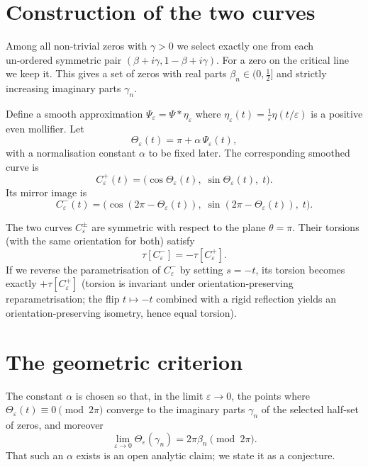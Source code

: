 \documentclass[12pt,a4paper]{article}
\begin{document}
\section{Construction of the two curves}

Among all non‑trivial zeros with \(\gamma>0\) we select exactly one from each
un‑ordered symmetric pair \((\beta+i\gamma, 1-\beta+i\gamma)\).  For a zero on the
critical line we keep it.  This gives a set of zeros with real parts
\(\beta_n\in(0,\frac12]\) and strictly increasing imaginary parts \(\gamma_n\).

Define a smooth approximation \(\Psi_\varepsilon = \Psi * \eta_\varepsilon\) where
\(\eta_\varepsilon(t)=\frac1\varepsilon\eta(t/\varepsilon)\) is a positive even
mollifier.  Let
\[
\Theta_\varepsilon(t) = \pi + \alpha\,\Psi_\varepsilon(t),
\]
with a normalisation constant \(\alpha\) to be fixed later.  The corresponding
smoothed curve is
\[
C_\varepsilon^+(t) = \bigl( \cos\Theta_\varepsilon(t),\; \sin\Theta_\varepsilon(t),\; t \bigr).
\]
Its mirror image is
\[
C_\varepsilon^-(t) = \bigl( \cos(2\pi-\Theta_\varepsilon(t)),\;
                         \sin(2\pi-\Theta_\varepsilon(t)),\; t \bigr).
\]

The two curves \(C_\varepsilon^\pm\) are symmetric with respect to the plane
\(\theta=\pi\).  Their torsions (with the same orientation for both) satisfy
\[
\tau[C_\varepsilon^-] = -\tau[C_\varepsilon^+].
\]
If we reverse the parametrisation of \(C_\varepsilon^-\) by setting \(s=-t\), its
torsion becomes exactly \(+\tau[C_\varepsilon^+]\) (torsion is invariant under
orientation‑preserving reparametrisation; the flip \(t\mapsto -t\) combined with
a rigid reflection yields an orientation‑preserving isometry, hence equal torsion).

\section{The geometric criterion}

The constant \(\alpha\) is chosen so that, in the limit \(\varepsilon\to0\), the
points where \(\Theta_\varepsilon(t) \equiv 0 \pmod{2\pi}\) converge to the
imaginary parts \(\gamma_n\) of the selected half‑set of zeros, and moreover
\[
\lim_{\varepsilon\to0} \Theta_\varepsilon(\gamma_n) = 2\pi\beta_n \pmod{2\pi}.
\]
That such an \(\alpha\) exists is an open analytic claim; we state it as a
conjecture.
\end{document}

